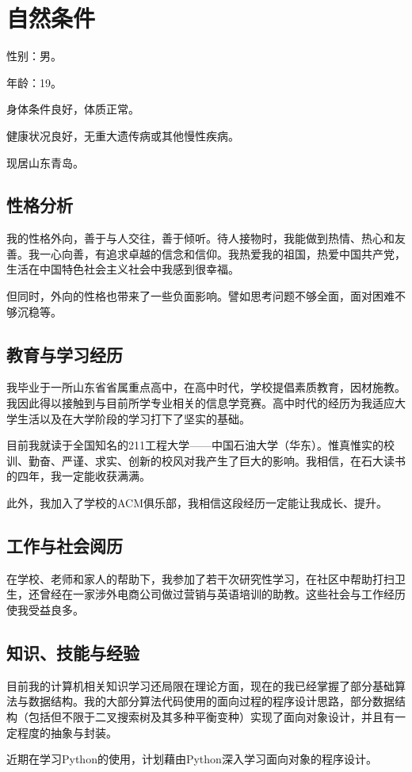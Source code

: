 \documentclass{article}
\begin{document}
\thispagestyle{empty}
\newpage
\setcounter{page}{1}
\section{自然条件}
性别：男。\par
年龄：19。\par
身体条件良好，体质正常。\par
健康状况良好，无重大遗传病或其他慢性疾病。\par
现居山东青岛。

\subsection{性格分析}
我的性格外向，善于与人交往，善于倾听。待人接物时，我能做到热情、热心和友善。我一心向善，有追求卓越的信念和信仰。我热爱我的祖国，热爱中国共产党，生活在中国特色社会主义社会中我感到很幸福。\par
但同时，外向的性格也带来了一些负面影响。譬如思考问题不够全面，面对困难不够沉稳等。

\subsection{教育与学习经历}
我毕业于一所山东省省属重点高中，在高中时代，学校提倡素质教育，因材施教。我因此得以接触到与目前所学专业相关的信息学竞赛。高中时代的经历为我适应大学生活以及在大学阶段的学习打下了坚实的基础。\par
目前我就读于全国知名的211工程大学——中国石油大学（华东）。惟真惟实的校训、勤奋、严谨、求实、创新的校风对我产生了巨大的影响。我相信，在石大读书的四年，我一定能收获满满。\par
此外，我加入了学校的ACM俱乐部，我相信这段经历一定能让我成长、提升。

\subsection{工作与社会阅历}
在学校、老师和家人的帮助下，我参加了若干次研究性学习，在社区中帮助打扫卫生，还曾经在一家涉外电商公司做过营销与英语培训的助教。这些社会与工作经历使我受益良多。

\subsection{知识、技能与经验}
目前我的计算机相关知识学习还局限在理论方面，现在的我已经掌握了部分基础算法与数据结构。我的大部分算法代码使用的面向过程的程序设计思路，部分数据结构（包括但不限于二叉搜索树及其多种平衡变种）实现了面向对象设计，并且有一定程度的抽象与封装。\par
近期在学习Python的使用，计划藉由Python深入学习面向对象的程序设计。
\end{document}
